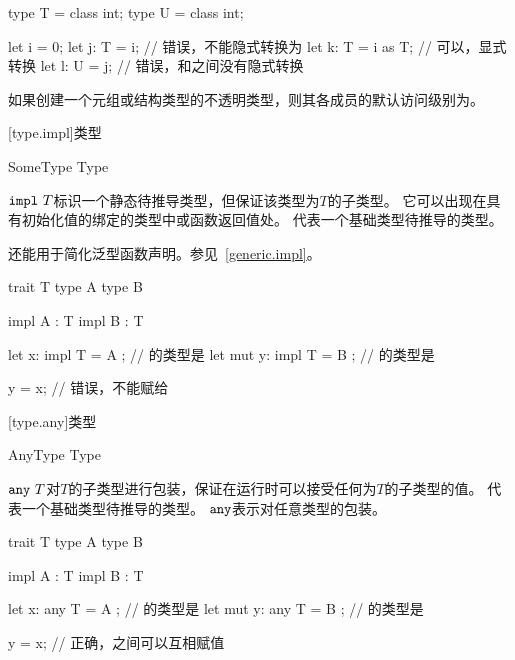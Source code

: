\enterexample
\begin{codeblock}

type T = class int;
type U = class int;

let i = 0;
let j: T = i; // 错误，不能隐式转换为
let k: T = i as T; // 可以，显式转换
let l: U = j; // 错误，和之间没有隐式转换

\end{codeblock}
\exitexample

\pnum
如果创建一个元组或结构类型的不透明类型，则其各成员的默认访问级别为。

[type.impl]{类型}

\begin{bnf}{SomeType}
     Type \br
     \terminal{_}
\end{bnf}

\pnum
$\tcode{impl}\ T$标识一个静态待推导类型，但保证该类型为$T$的子类型。
它可以出现在具有初始化值的绑定的类型中或函数返回值处。
代表一个基础类型待推导的类型。

\pnum
{}还能用于简化泛型函数声明。参见~\ref{generic.impl}。

\enterexample
\begin{codeblock}

trait T { }
type A { }
type B { }

impl A : T { }
impl B : T { }

let x: impl T = A { }; // 的类型是
let mut y: impl T = B { }; // 的类型是

y = x; // 错误，不能赋给

\end{codeblock}
\exitexample

[type.any]{类型}

\begin{bnf}{AnyType}
     Type \br
     \terminal{_} \br
\end{bnf}

\pnum
$\tcode{any}\ T$对$T$的子类型进行包装，保证在运行时可以接受任何为$T$的子类型的值。
代表一个基础类型待推导的类型。
$\texttt{any}$表示对任意类型的包装。

\enterexample
\begin{codeblock}

trait T { }
type A { }
type B { }

impl A : T { }
impl B : T { }

let x: any T = A { }; // 的类型是
let mut y: any T = B { }; // 的类型是

y = x; // 正确，之间可以互相赋值

\end{codeblock}
\exitexample

